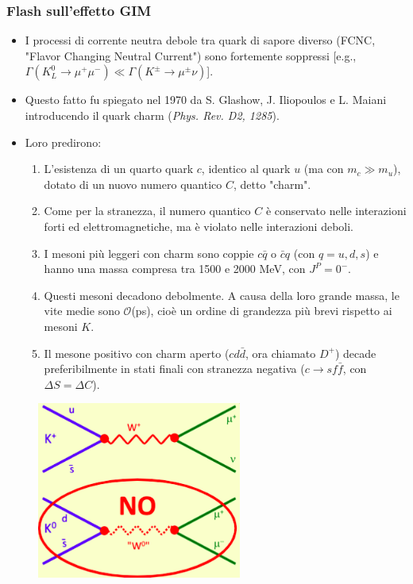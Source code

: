 \subsubsection{Flash sull'effetto GIM}
\begin{itemize}
    \item I processi di corrente neutra debole tra quark di sapore diverso (FCNC, "Flavor Changing Neutral Current") sono fortemente soppressi [e.g., \(\Gamma(K^0_L \to \mu^+\mu^-) \ll \Gamma(K^\pm \to \mu^\pm\nu)\)].
    \item Questo fatto fu spiegato nel 1970 da S. Glashow, J. Iliopoulos e L. Maiani introducendo il quark charm (\textit{Phys. Rev. D2, 1285}).
    \item Loro predirono:
    \begin{enumerate}
        \item L'esistenza di un quarto quark $c$, identico al quark $u$ (ma con $m_c \gg m_u$), dotato di un nuovo numero quantico $C$, detto "charm".
        \item Come per la stranezza, il numero quantico $C$ è conservato nelle interazioni forti ed elettromagnetiche, ma è violato nelle interazioni deboli.
        \item I mesoni più leggeri con charm sono coppie \(c\bar q\) o \(\bar cq\) (con \(q = u, d, s\)) e hanno una massa compresa tra 1500 e 2000 MeV, con \(J^P = 0^-\).
        \item Questi mesoni decadono debolmente. A causa della loro grande massa, le vite medie sono $\mathcal{O}$(ps), cioè un ordine di grandezza più brevi rispetto ai mesoni \(K\).
        \item Il mesone positivo con charm aperto (\(cd\bar d\), ora chiamato \(D^+\)) decade preferibilmente in stati finali con stranezza negativa (\(c \to sf\bar f\), con \(\Delta S = \Delta C\)). 
    \end{enumerate}
\end{itemize}
\begin{figure}[H]
    \centering
    \includegraphics[width=0.6\textwidth]{immagini/fig_flash_gim.png}
\end{figure}
